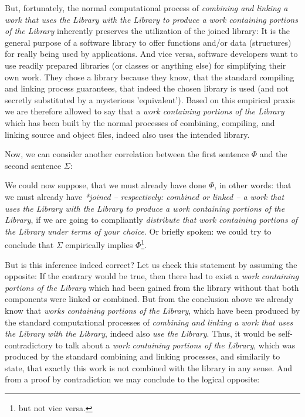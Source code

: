 But, fortunately, the normal computational process of \emph{combining and
linking a work that uses the Library with the Library to produce a work
containing portions of the Library} inherently preserves the utilization of the
joined library: It is the general purpose of a software library to offer
functions and/or data (structures) for really being used by applications. And
vice versa, software developers want to use readily prepared libraries (or
classes or anything else) for simplifying their own work. They chose a library
because they know, that the standard compiling and linking process guarantees,
that indeed the chosen library is used (and not secretly substituted by a
mysterious 'equivalent'). Based on this empirical praxis we are therefore
allowed to say that a \emph{work containing portions of the Library}
which has been built by the normal processes of combining, compiling, and
linking source and object files, indeed also uses the intended library.

Now, we can consider another correlation between the first sentence $\Phi$
and the second sentence $\Sigma$:

We could now suppose, that we must already have done $\Phi$, in other words:
that we must already have \emph{*joined -- respectively: combined or linked -- a
work that uses the Library with the Library to produce a work containing
portions of the Library}, if we are going to compliantly \emph{distribute that
work containing portions of the Library under terms of your choice}. Or briefly
spoken: we could try to conclude that $\Sigma$ empirically implies
$\Phi$\footnote{but not vice versa.}. 

But is this inference indeed correct? Let us check this statement by assuming
the opposite: If the contrary would be true, then there had to exist a
\emph{work containing portions of the Library} which had been gained from the
library without that both components were linked or combined. But from the
conclusion above we already know that \emph{works containing portions of the
Library}, which have been produced by the standard computational processes of
\emph{combining and linking a work that uses the Library with the Library},
indeed also \emph{use the Library}. Thus, it would be self-contradictory to talk
about a \emph{work containing portions of the Library}, which was produced by
the standard combining and linking processes, and similarily to state, that
exactly this work is not combined with the library in any sense. And from a
proof by contradiction we may conclude to the logical opposite:

